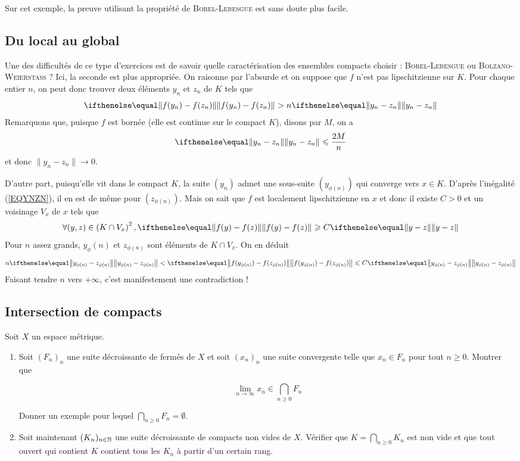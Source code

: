 \bigskip

Sur cet exemple, la preuve utilisant la propriété de \textsc{Borel-Lebesgue} est sans doute plus facile.

\subsection{Du local au global}

Une des difficultés de ce type d'exercices est de savoir quelle caractérisation des ensembles compacts choisir :
\textsc{Borel-Lebesgue} ou \textsc{Bolzano-Weierstass} ? Ici, la seconde est plus appropriée. On raisonne par l'absurde et on suppose que $f$ n'est pas lipschitzienne sur $K$. Pour chaque entier $n$, on peut donc trouver
deux éléments $y_n$ et $z_n$ de $K$ tels que 
\[
    \norme{f(y_n)-f(z_n)}{} >n \norme{y_n-z_n}{}
\]
Remarquons que, puisque $f$ est bornée (elle est continue sur le compact $K$), disons par $M$,
on a 
\begin{equation}\label{EQYNZN}
    \norme{y_n-z_n}{} \leqslant \frac{2M}{n}
\end{equation}
et donc $\|y_n-z_n\|\to 0$.

D'autre part, puisqu'elle vit dans le compact $K$, la suite $(y_n)$ admet une sous-suite $\left(y_{\phi(n)}\right)$ qui converge vers $x\in K$. D'après l'inégalité (\ref{EQYNZN}), il en est de même pour $(z_{\phi(n)})$. Mais on sait que $f$ est localement lipschitzienne en $x$ et donc il existe $C>0$ et un voisinage $V_x$ de $x$ tels que
\[
    \forall (y,z)\in \left(K \cap V_x\right)^2, \norme{f(y)-f(z)}{} \geqslant C\norme{y-z}{}
\]
Pour $n$ assez grands, $y_\phi(n)$ et $z_{\phi(n)}$ sont éléments de $K\cap V_x$. On en déduit
\[
    n\norme{y_{\phi(n)}-z_{\phi(n)}}{}<\norme{f(y_{\phi(n)})-f(z_{\phi(n)})}{} \leqslant C \norme{y_{\phi(n)}-z_{\phi(n)}}{}
\]
Faisant tendre $n$ vers $+\infty$, c'est manifestement une contradiction !

\subsection{Intersection de compacts}

Soit $X$ un espace métrique.
\begin{enumerate}

    \item Soit $(F_n)_n$ une suite décroissante de fermés de $X$ et soit $(x_n)_n$ une suite convergente telle que $x_n\in F_n $ pour tout $n \geqslant 0$. Montrer que

\[
    \lim_{n\to \infty} x_n \in \bigcap_{n\geqslant 0} F_n
\]

Donner un exemple pour lequel $\bigcap_{n\geqslant 0} F_n = \emptyset$. 
    
    \item Soit maintenant $(K_n)_{n\in\mathbb{N}}$ une suite décroissante de compacts non vides de $X$. Vérifier que $K = \bigcap\limits_{n\geqslant 0} K_n$ est non vide et que tout ouvert qui contient $K$ contient tous les $K_n$ à partir d'un certain rang.
\end{enumerate}

